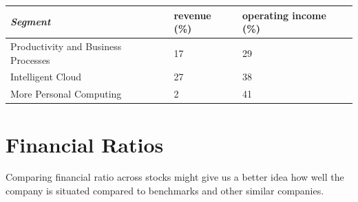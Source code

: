 \documentclass[]{article}
\begin{document}
\begin{table}[]
	\begin{tabular}{|l|l|l|}
		\hline
		\textit{\textbf{Segment}} & \textbf{revenue (\%)} & \textbf{operating income (\%)} \\ \hline
		Productivity and Business Processes & 17 & 29 \\ \hline
		Intelligent Cloud & 27 & 38 \\ \hline
		More Personal Computing & 2 & 41 \\ \hline
	\end{tabular}
\end{table}


\section{Financial Ratios}
Comparing financial ratio across stocks might give us a better idea how well the company is situated compared to benchmarks and other similar companies.
\end{document}
